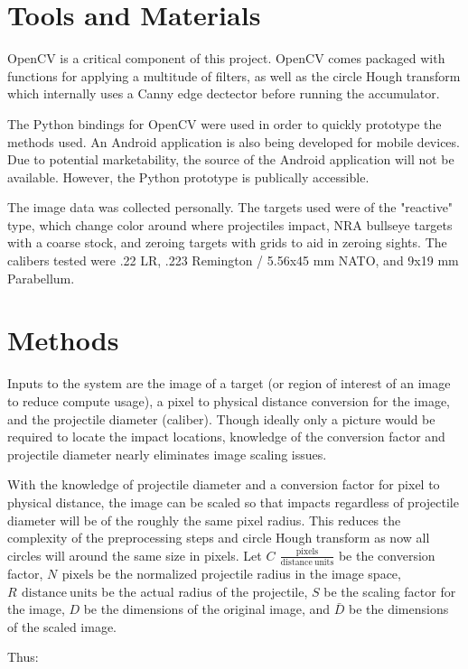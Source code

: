 \documentclass{article}
\newcommand{\unit}[1]{\ensuremath{\, \mathrm{#1}}}
\begin{document}
\section{Tools and Materials}
\label{sec:tools}
OpenCV is a critical component of this project. OpenCV comes packaged with functions for
applying a multitude of filters, as well as the circle Hough transform which internally uses a
Canny edge dectector before running the accumulator.

The Python bindings for OpenCV were used in order to quickly prototype the methods used.
An Android application is also being developed for mobile devices.
Due to potential marketability, the source of the Android application will not be available.
However, the Python prototype is publically accessible.

The image data was collected personally. The targets used were of the "reactive" type, which
change color around where projectiles impact, NRA bullseye targets with a coarse stock, and
zeroing targets with grids to aid in zeroing sights. The calibers tested were .22 LR,
.223 Remington / 5.56x45 mm NATO, and 9x19 mm Parabellum.

\section{Methods}
\label{sec:methods}
Inputs to the system are the image of a target (or region of interest of an image to reduce
compute usage), a pixel to physical distance conversion for the image,
and the projectile diameter (caliber). Though ideally only a picture would
be required to locate the impact locations, knowledge of the conversion factor and projectile
diameter nearly eliminates image scaling issues.

With the knowledge of projectile diameter and a conversion factor for pixel to physical distance,
the image can be scaled so that impacts regardless of projectile diameter will be of the roughly
the same pixel radius. This reduces the complexity of the preprocessing steps and circle Hough
transform as now all circles will around the same size in pixels.
Let \(C\ \unit{\frac{pixels}{distance\ units}}\) be the conversion factor, \(N\ \unit{pixels}\)
be the normalized projectile radius in the image space, \(R\ \unit{distance\ units}\) be the 
actual radius of the projectile, \(S\) be the scaling factor for the image, \(D\) be 
the dimensions of the original image, and \(\bar{D}\) be the dimensions of the scaled image.

Thus:
\end{document}
